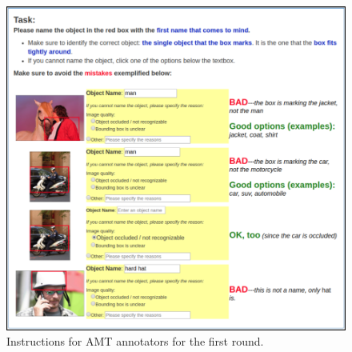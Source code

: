 \begin{figure}[htp]
  \centering
  \includegraphics[width=1.5\columnwidth]{figures/round0.png}
  \caption{Instructions for AMT annotators for the first round.}
  \label{fig:instructions1}
\end{figure}


